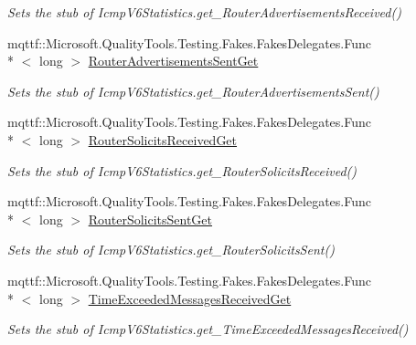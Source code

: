 \begin{DoxyCompactItemize}
\begin{DoxyCompactList}\small\item\em Sets the stub of Icmp\-V6\-Statistics.\-get\-\_\-\-Router\-Advertisements\-Received()\end{DoxyCompactList}\item 
mqttf\-::\-Microsoft.\-Quality\-Tools.\-Testing.\-Fakes.\-Fakes\-Delegates.\-Func\\*
$<$ long $>$ \hyperlink{class_system_1_1_net_1_1_network_information_1_1_fakes_1_1_stub_icmp_v6_statistics_ae6000e1fd2203b98721d9e2d321faf9e}{Router\-Advertisements\-Sent\-Get}
\begin{DoxyCompactList}\small\item\em Sets the stub of Icmp\-V6\-Statistics.\-get\-\_\-\-Router\-Advertisements\-Sent()\end{DoxyCompactList}\item 
mqttf\-::\-Microsoft.\-Quality\-Tools.\-Testing.\-Fakes.\-Fakes\-Delegates.\-Func\\*
$<$ long $>$ \hyperlink{class_system_1_1_net_1_1_network_information_1_1_fakes_1_1_stub_icmp_v6_statistics_a11030a8f4b359f84cfde009b739a3920}{Router\-Solicits\-Received\-Get}
\begin{DoxyCompactList}\small\item\em Sets the stub of Icmp\-V6\-Statistics.\-get\-\_\-\-Router\-Solicits\-Received()\end{DoxyCompactList}\item 
mqttf\-::\-Microsoft.\-Quality\-Tools.\-Testing.\-Fakes.\-Fakes\-Delegates.\-Func\\*
$<$ long $>$ \hyperlink{class_system_1_1_net_1_1_network_information_1_1_fakes_1_1_stub_icmp_v6_statistics_ac57d6947c3b14b047cb10040b6f33812}{Router\-Solicits\-Sent\-Get}
\begin{DoxyCompactList}\small\item\em Sets the stub of Icmp\-V6\-Statistics.\-get\-\_\-\-Router\-Solicits\-Sent()\end{DoxyCompactList}\item 
mqttf\-::\-Microsoft.\-Quality\-Tools.\-Testing.\-Fakes.\-Fakes\-Delegates.\-Func\\*
$<$ long $>$ \hyperlink{class_system_1_1_net_1_1_network_information_1_1_fakes_1_1_stub_icmp_v6_statistics_a93dfd4bf261ee3576a171945d487eba6}{Time\-Exceeded\-Messages\-Received\-Get}
\begin{DoxyCompactList}\small\item\em Sets the stub of Icmp\-V6\-Statistics.\-get\-\_\-\-Time\-Exceeded\-Messages\-Received()\end{DoxyCompactList}\item 

\end{DoxyCompactItemize}
